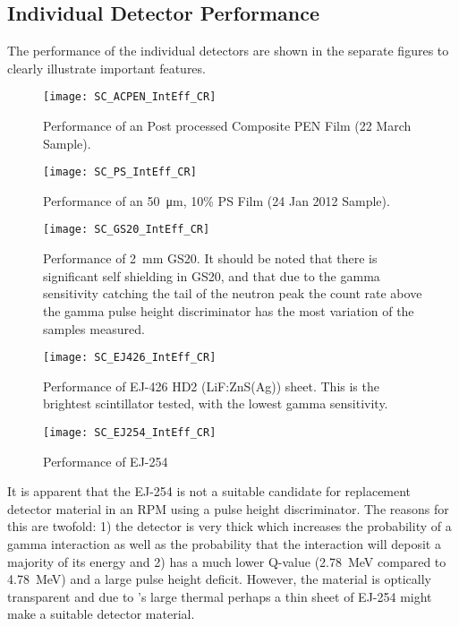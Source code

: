\documentclass[onecolumn]{IEEEtran}
\begin{document}
\subsection{Individual Detector Performance}
The performance of the individual detectors are shown in the separate figures to clearly illustrate important features.
\begin{figure}
  \centering
  \texttt{[image: SC\_ACPEN\_IntEff\_CR]}
  \caption[Post processed Composite PEN Performance]{Performance of an Post processed Composite PEN Film (22 March Sample).}
  \label{fig:ACPENPreformance}
\end{figure}
\begin{figure}
  \centering
  \texttt{[image: SC\_PS\_IntEff\_CR]}
  \caption[Cast Polystyrene Performance]{Performance of an \SI{50}{\um}, 10\%  PS Film (24 Jan 2012 Sample).}
  \label{fig:PSPreformance}
\end{figure}
\begin{figure}
  \centering
  \texttt{[image: SC\_GS20\_IntEff\_CR]}
  \caption[GS20 Performance]{Performance of \SI{2}{\mm} GS20.  It should be noted that there is significant self shielding in GS20, and that due to the gamma sensitivity catching the tail of the neutron peak the count rate above the gamma pulse height discriminator has the most variation of the samples measured.}
  \label{fig:GS20Preformance}
\end{figure}
\begin{figure}
  \centering
  \texttt{[image: SC\_EJ426\_IntEff\_CR]}
  \caption[EJ 426 Performance]{Performance of EJ-426 HD2 (LiF:ZnS(Ag)) sheet.  This is the brightest scintillator tested, with the lowest gamma sensitivity.}
  \label{fig:EJ254Perf}
\end{figure}
\begin{figure}
  \centering
  \texttt{[image: SC\_EJ254\_IntEff\_CR]}
  \caption[EJ 254 Performance]{Performance of EJ-254}
  \label{fig:EJ254Preformance}
\end{figure}
It is apparent that the EJ-254 is not a suitable candidate for replacement detector material in an RPM using a pulse height discriminator.
The reasons for this are twofold: 1) the detector is very thick which increases the probability of a gamma interaction as well as the probability that the interaction will deposit a majority of its energy and 2)  has a much lower Q-value (\SI{2.78}{\MeV} compared to \SI{4.78}{\MeV}) and a large pulse height deficit.
However, the material is optically transparent and due to 's large thermal perhaps a thin sheet of EJ-254 might make a suitable detector material.
\end{document}
